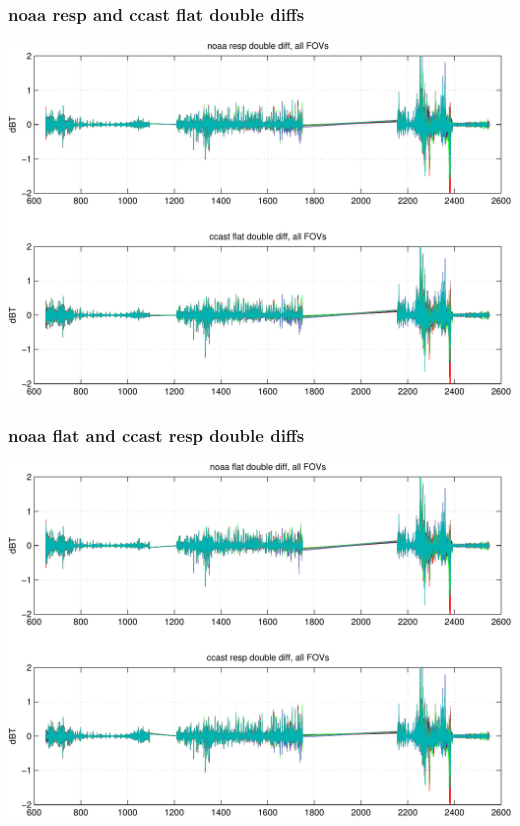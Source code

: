 \documentclass[11pt]{beamer}
\begin{document}
\begin{frame}
\frametitle{noaa resp and ccast flat double diffs}
\begin{center}
  \includegraphics[scale=0.5]{figures/cal_ddif_1.pdf}
\end{center}
\end{frame}

\begin{frame}
\frametitle{noaa flat and ccast resp double diffs}
\begin{center}
  \includegraphics[scale=0.5]{figures/cal_ddif_2.pdf}
\end{center}
\end{frame}
\end{document}
